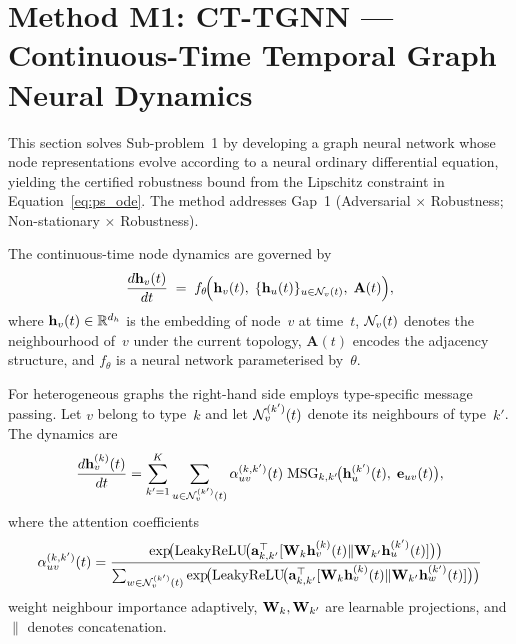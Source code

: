 \section{Method M1: CT-TGNN --- Continuous-Time Temporal Graph Neural Dynamics}
\label{sec:ct_tgnn}

This section solves Sub-problem~1 by developing a graph neural network whose node representations evolve according to a neural ordinary differential equation, yielding the certified robustness bound from the Lipschitz constraint in Equation~\eqref{eq:ps_ode}. The method addresses Gap~1 (Adversarial $\times$ Robustness; Non-stationary $\times$ Robustness).

The continuous-time node dynamics are governed by
\begin{equation}
\frac{d\mathbf{h}_v(t)}{dt}
\;=\; f_\theta\!\Bigl(\mathbf{h}_v(t),\;\{\mathbf{h}_u(t)\}_{u\in\mathcal{N}_v(t)},\;\mathbf{A}(t)\Bigr),
\label{eq:ct_tgnn_homo}
\end{equation}
where $\mathbf{h}_v(t)\in\mathbb{R}^{d_h}$ is the embedding of node~$v$ at time~$t$, $\mathcal{N}_v(t)$ denotes the neighbourhood of~$v$ under the current topology, $\mathbf{A}(t)$ encodes the adjacency structure, and $f_\theta$ is a neural network parameterised by~$\theta$.

For heterogeneous graphs the right-hand side employs type-specific message passing. Let $v$ belong to type~$k$ and let $\mathcal{N}_v^{(k')}(t)$ denote its neighbours of type~$k'$. The dynamics are
\begin{equation}
\frac{d\mathbf{h}_v^{(k)}(t)}{dt}
= \sum_{k'=1}^{K}\sum_{u\in\mathcal{N}_v^{(k')}(t)}
  \alpha_{uv}^{(k,k')}(t)\;\mathrm{MSG}_{k,k'}\!\bigl(
    \mathbf{h}_u^{(k')}(t),\;\mathbf{e}_{uv}(t)\bigr),
\label{eq:ct_tgnn_hetero}
\end{equation}
where the attention coefficients~\cite{Velickovic2018}
\begin{equation}
\alpha_{uv}^{(k,k')}(t)
= \frac{
  \exp\!\bigl(\mathrm{LeakyReLU}\!\bigl(
    \mathbf{a}_{k,k'}^\top
    [\mathbf{W}_k\mathbf{h}_v^{(k)}(t)\|\mathbf{W}_{k'}\mathbf{h}_u^{(k')}(t)]
  \bigr)\bigr)
}{
  \sum_{w\in\mathcal{N}_v^{(k')}(t)}
  \exp\!\bigl(\mathrm{LeakyReLU}\!\bigl(
    \mathbf{a}_{k,k'}^\top
    [\mathbf{W}_k\mathbf{h}_v^{(k)}(t)\|\mathbf{W}_{k'}\mathbf{h}_w^{(k')}(t)]
  \bigr)\bigr)
}
\label{eq:ct_tgnn_attn}
\end{equation}
weight neighbour importance adaptively, $\mathbf{W}_k,\mathbf{W}_{k'}$ are learnable projections, and $\|$ denotes concatenation.

